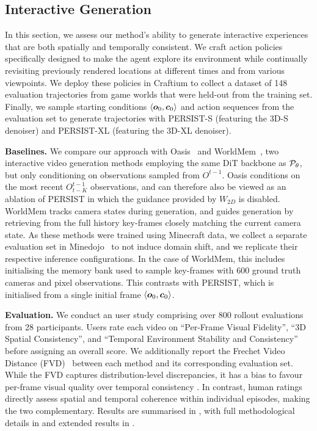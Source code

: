 \documentclass{article}
\theoremstyle{plain}
\theoremstyle{definition}
\theoremstyle{remark}
\begin{document}
\subsection{Interactive Generation}

In this section, we assess our method's ability to generate interactive experiences that are both spatially and temporally consistent. We craft action policies specifically designed to make the agent explore its environment while continually revisiting previously rendered locations at different times and from various viewpoints. We deploy these policies in Craftium to collect a dataset of 148 evaluation trajectories from game worlds that were held-out from the training set. Finally, we sample starting conditions $\langle {\bm{o}}_0, {\bm{c}}_0\rangle$ and action sequences from the evaluation set to generate trajectories with PERSIST-S (featuring the 3D-S denoiser) and PERSIST-XL (featuring the 3D-XL denoiser).


\textbf{Baselines.} We compare our approach with Oasis~\citep{decart2024oasis} and WorldMem~\citep{xiao2025worldmemlongtermconsistentworld}, two interactive video generation methods employing the same DiT backbone as ${\mathcal{P}}_\theta$, but only conditioning on observations sampled from $O^{t-1}$.
Oasis conditions on the most recent $O^{t-1}_{t-K}$ observations, and can therefore also be viewed as an ablation of PERSIST in which the guidance provided by $W_{2D}$ is disabled.
WorldMem tracks camera states during generation, and guides generation by retrieving from the full history key-frames closely matching the current camera state.
As these methods were trained using Minecraft data, we collect a separate evaluation set in Minedojo~\citep{fan2022minedojo} to not induce domain shift, and we replicate their respective inference configurations.
In the case of WorldMem, this includes initialising the memory bank used to sample key-frames with 600 ground truth cameras and pixel observations.
This contrasts with PERSIST, which is initialised from a single initial frame $\langle {\bm{o}}_0, {\bm{c}}_0 \rangle$.




\textbf{Evaluation.}
We conduct an user study comprising over 800 rollout evaluations from 28 participants. Users rate each video on ``Per-Frame Visual Fidelity'', ``3D Spatial Consistency'', and ``Temporal Environment Stability and Consistency'' before assigning an overall score. We additionally report the Frechet Video Distance (FVD)~\citep{unterthiner2018towards} between each method and its corresponding evaluation set. While the FVD captures distribution-level discrepancies, it has a bias to favour per-frame visual quality over temporal consistency \citep{ge2024content}. In contrast, human ratings directly assess spatial and temporal coherence within individual episodes, making the two complementary. Results are summarised in , with full methodological details in  and extended results in .
\end{document}
